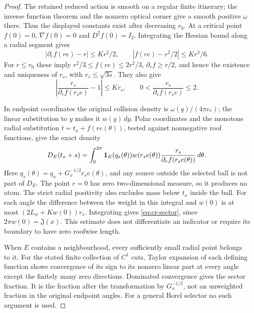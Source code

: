 \begin{proof}
The retained reduced action is smooth on a regular finite itinerary;
the inverse function theorem and the nonzero optical corner give a
smooth positive $\omega$ there. Thus the displayed constants exist
after decreasing $r_0$. At a critical point $f(0)=0$,
$\nabla f(0)=0$ and $D^2f(0)=I_2$. Integrating the Hessian bound
along a radial segment gives
\[
 |\partial_r f(re)-r|\le Kr^2/2,\qquad
 |f(re)-r^2/2|\le Kr^3/6.
\]
For $r\le r_0$ these imply
$r^2/3\le f(re)\le2r^2/3$, $\partial_r f\ge r/2$, and hence
the existence and uniqueness of $r_s$, with $r_s\le\sqrt{3s}$.
They also give
\[
 \left|\frac{r_s}{\partial_r f(r_s e)}-1\right|\le Kr_s,
 \qquad 0<\frac{r_s}{\partial_r f(r_s e)}\le2.
\]

In endpoint coordinates the original collision density is
$\omega(q)/(4\pi c_*)$; the linear substitution to $y$ makes it
$w(y)\,dy$. Polar coordinates and the monotone radial substitution
$t=t_x+f(re(\theta))$, tested against nonnegative roof functions,
give the exact density
\[
 D_E(t_x+s)=\int_0^{2\pi}\mathbf1_E(q_s(\theta))
       w(r_s e(\theta))
       \frac{r_s}{\partial_r f(r_s e(\theta))}\,d\theta.
\]
Here $q_s(\theta)=q_x+G_x^{-1/2}r_s e(\theta)$, and any source
outside the selected ball is not part of $D_E$. The point $r=0$
has zero two-dimensional measure, so it produces no atom. The
strict radial positivity also excludes mass below $t_x$ inside the
ball. For each angle the difference between the weight in this
integral and $w(0)$ is at most
$(2L_w+Kw(0))r_s$. Integrating gives
\eqref{eq:cr-sector}, since $2\pi w(0)=\mathfrak J(x)$.
This estimate does not differentiate an indicator or require its
boundary to have zero roofwise length.

When $E$ contains a neighbourhood, every sufficiently small radial
point belongs to it. For the stated finite collection of $C^1$
cuts, Taylor expansion of each defining function shows convergence
of its sign to its nonzero linear part at every angle except the
finitely many zero directions. Dominated convergence gives the
sector fraction. It is the fraction after the transformation by
$G_x^{-1/2}$, not an unweighted fraction in the original endpoint
angles. For a general Borel selector no such argument is used.
\end{proof}

